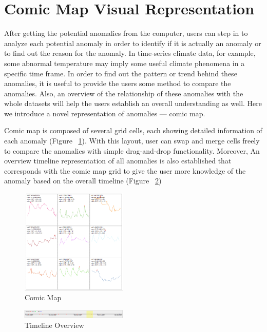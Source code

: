 \documentclass{vgtc}                          %
\begin{document}
\section{Comic Map Visual Representation}

After getting the potential anomalies from the computer, users can step in to analyze each potential anomaly in order to identify if it is actually an anomaly or to find out the reason for the anomaly. In time-series climate data, for example, some abnormal temperature may imply some useful climate phenomena in a specific time frame. In order to find out the pattern or trend behind these anomalies, it is useful to provide the users some method to compare the anomalies. Also, an overview of the relationship of these anomalies with the whole datasets will help the users establish an overall understanding as well. Here we introduce a novel representation of anomalies --– comic map. 

Comic map is composed of several grid cells, each showing detailed information of each anomaly (Figure ~\ref{fig:comicMap9Cell}). With this layout, user can swap and merge cells freely to compare the anomalies with simple drag-and-drop functionality. Moreover, An overview timeline representation of all anomalies is also established that corresponds with the comic map grid to give the user more knowledge of the anomaly based on the overall timeline (Figure ~\ref{fig:timeline})

\begin{figure}[htb]
	\centering
	\includegraphics[width=0.45\textwidth]{comicMap9Cell.jpg}
	\caption{Comic Map}
	\label{fig:comicMap9Cell}
\end{figure}

\begin{figure}[htb]
	\centering
	\includegraphics[width=0.45\textwidth]{timeline.png}
	\caption{Timeline Overview}
	\label{fig:timeline}
\end{figure}
\end{document}
